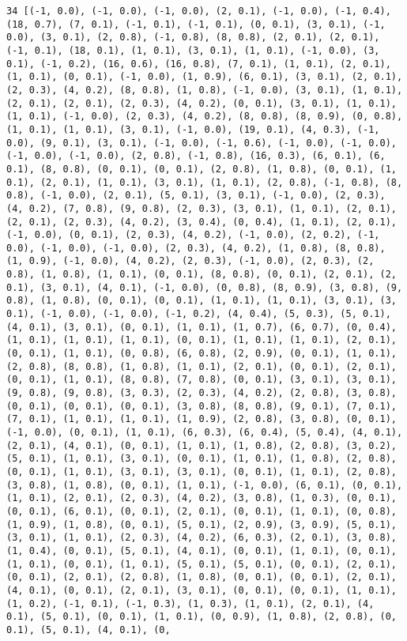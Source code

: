 \documentclass[11pt]{article}
\begin{document}
\begin{Verbatim}[commandchars=\\\{\}]
34 [(-1, 0.0), (-1, 0.0), (-1, 0.0), (2, 0.1), (-1, 0.0), (-1, 0.4), (18, 0.7), (7, 0.1), (-1, 0.1), (-1, 0.1), (0, 0.1), (3, 0.1), (-1, 0.0), (3, 0.1), (2, 0.8), (-1, 0.8), (8, 0.8), (2, 0.1), (2, 0.1), (-1, 0.1), (18, 0.1), (1, 0.1), (3, 0.1), (1, 0.1), (-1, 0.0), (3, 0.1), (-1, 0.2), (16, 0.6), (16, 0.8), (7, 0.1), (1, 0.1), (2, 0.1), (1, 0.1), (0, 0.1), (-1, 0.0), (1, 0.9), (6, 0.1), (3, 0.1), (2, 0.1), (2, 0.3), (4, 0.2), (8, 0.8), (1, 0.8), (-1, 0.0), (3, 0.1), (1, 0.1), (2, 0.1), (2, 0.1), (2, 0.3), (4, 0.2), (0, 0.1), (3, 0.1), (1, 0.1), (1, 0.1), (-1, 0.0), (2, 0.3), (4, 0.2), (8, 0.8), (8, 0.9), (0, 0.8), (1, 0.1), (1, 0.1), (3, 0.1), (-1, 0.0), (19, 0.1), (4, 0.3), (-1, 0.0), (9, 0.1), (3, 0.1), (-1, 0.0), (-1, 0.6), (-1, 0.0), (-1, 0.0), (-1, 0.0), (-1, 0.0), (2, 0.8), (-1, 0.8), (16, 0.3), (6, 0.1), (6, 0.1), (8, 0.8), (0, 0.1), (0, 0.1), (2, 0.8), (1, 0.8), (0, 0.1), (1, 0.1), (2, 0.1), (1, 0.1), (3, 0.1), (1, 0.1), (2, 0.8), (-1, 0.8), (8, 0.8), (-1, 0.0), (2, 0.1), (5, 0.1), (3, 0.1), (-1, 0.0), (2, 0.3), (4, 0.2), (7, 0.8), (9, 0.8), (2, 0.3), (3, 0.1), (1, 0.1), (2, 0.1), (2, 0.1), (2, 0.3), (4, 0.2), (3, 0.4), (0, 0.4), (1, 0.1), (2, 0.1), (-1, 0.0), (0, 0.1), (2, 0.3), (4, 0.2), (-1, 0.0), (2, 0.2), (-1, 0.0), (-1, 0.0), (-1, 0.0), (2, 0.3), (4, 0.2), (1, 0.8), (8, 0.8), (1, 0.9), (-1, 0.0), (4, 0.2), (2, 0.3), (-1, 0.0), (2, 0.3), (2, 0.8), (1, 0.8), (1, 0.1), (0, 0.1), (8, 0.8), (0, 0.1), (2, 0.1), (2, 0.1), (3, 0.1), (4, 0.1), (-1, 0.0), (0, 0.8), (8, 0.9), (3, 0.8), (9, 0.8), (1, 0.8), (0, 0.1), (0, 0.1), (1, 0.1), (1, 0.1), (3, 0.1), (3, 0.1), (-1, 0.0), (-1, 0.0), (-1, 0.2), (4, 0.4), (5, 0.3), (5, 0.1), (4, 0.1), (3, 0.1), (0, 0.1), (1, 0.1), (1, 0.7), (6, 0.7), (0, 0.4), (1, 0.1), (1, 0.1), (1, 0.1), (0, 0.1), (1, 0.1), (1, 0.1), (2, 0.1), (0, 0.1), (1, 0.1), (0, 0.8), (6, 0.8), (2, 0.9), (0, 0.1), (1, 0.1), (2, 0.8), (8, 0.8), (1, 0.8), (1, 0.1), (2, 0.1), (0, 0.1), (2, 0.1), (0, 0.1), (1, 0.1), (8, 0.8), (7, 0.8), (0, 0.1), (3, 0.1), (3, 0.1), (9, 0.8), (9, 0.8), (3, 0.3), (2, 0.3), (4, 0.2), (2, 0.8), (3, 0.8), (0, 0.1), (0, 0.1), (0, 0.1), (3, 0.8), (8, 0.8), (9, 0.1), (7, 0.1), (7, 0.1), (1, 0.1), (1, 0.1), (1, 0.9), (2, 0.8), (3, 0.8), (0, 0.1), (-1, 0.0), (0, 0.1), (1, 0.1), (6, 0.3), (6, 0.4), (5, 0.4), (4, 0.1), (2, 0.1), (4, 0.1), (0, 0.1), (1, 0.1), (1, 0.8), (2, 0.8), (3, 0.2), (5, 0.1), (1, 0.1), (3, 0.1), (0, 0.1), (1, 0.1), (1, 0.8), (2, 0.8), (0, 0.1), (1, 0.1), (3, 0.1), (3, 0.1), (0, 0.1), (1, 0.1), (2, 0.8), (3, 0.8), (1, 0.8), (0, 0.1), (1, 0.1), (-1, 0.0), (6, 0.1), (0, 0.1), (1, 0.1), (2, 0.1), (2, 0.3), (4, 0.2), (3, 0.8), (1, 0.3), (0, 0.1), (0, 0.1), (6, 0.1), (0, 0.1), (2, 0.1), (0, 0.1), (1, 0.1), (0, 0.8), (1, 0.9), (1, 0.8), (0, 0.1), (5, 0.1), (2, 0.9), (3, 0.9), (5, 0.1), (3, 0.1), (1, 0.1), (2, 0.3), (4, 0.2), (6, 0.3), (2, 0.1), (3, 0.8), (1, 0.4), (0, 0.1), (5, 0.1), (4, 0.1), (0, 0.1), (1, 0.1), (0, 0.1), (1, 0.1), (0, 0.1), (1, 0.1), (5, 0.1), (5, 0.1), (0, 0.1), (2, 0.1), (0, 0.1), (2, 0.1), (2, 0.8), (1, 0.8), (0, 0.1), (0, 0.1), (2, 0.1), (4, 0.1), (0, 0.1), (2, 0.1), (3, 0.1), (0, 0.1), (0, 0.1), (1, 0.1), (1, 0.2), (-1, 0.1), (-1, 0.3), (1, 0.3), (1, 0.1), (2, 0.1), (4, 0.1), (5, 0.1), (0, 0.1), (1, 0.1), (0, 0.9), (1, 0.8), (2, 0.8), (0, 0.1), (5, 0.1), (4, 0.1), (0, 
\end{Verbatim}
\end{document}
